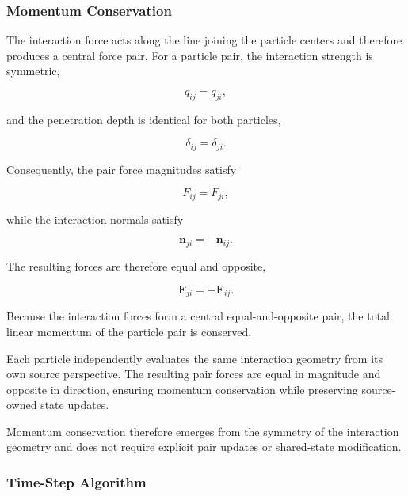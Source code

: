 \subsubsection{Momentum Conservation}

The interaction force acts along the line joining the
particle centers and therefore produces a central
force pair. For a particle pair, the interaction
strength is symmetric,

\begin{equation}
q_{ij}=q_{ji},
\end{equation}

and the penetration depth is identical for both
particles,

\begin{equation}
\delta_{ij}=\delta_{ji}.
\end{equation}

Consequently, the pair force magnitudes satisfy

\begin{equation}
F_{ij}=F_{ji},
\end{equation}

while the interaction normals satisfy

\begin{equation}
\mathbf{n}_{ji}=-\mathbf{n}_{ij}.
\end{equation}

The resulting forces are therefore equal and
opposite,

\begin{equation}
\mathbf{F}_{ji}=-\mathbf{F}_{ij}.
\end{equation}

Because the interaction forces form a central
equal-and-opposite pair, the total linear momentum
of the particle pair is conserved.

Each particle independently evaluates the same
interaction geometry from its own source
perspective. The resulting pair forces are equal
in magnitude and opposite in direction, ensuring
momentum conservation while preserving source-owned
state updates.

Momentum conservation therefore emerges from the
symmetry of the interaction geometry and does not
require explicit pair updates or shared-state
modification.

\subsubsection{Time-Step Algorithm}


